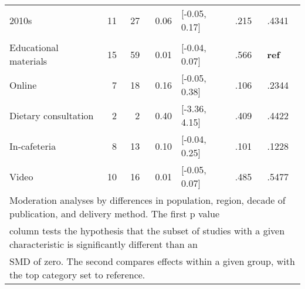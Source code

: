 \documentclass[sn-nature,referee,pdflatex]{sn-jnl}
\begin{document}
\begin{table}[!h]
\begin{tabular}[t]{lrrrlll}
\hspace{1em}2010s & 11 & 27 & 0.06 & {}[-0.05, 0.17] & .215 & .4341\\
\addlinespace[0.3em]
\multicolumn{7}{l}{\textbf{Method of Delivery}}\\
\hspace{1em}Educational materials & 15 & 59 & 0.01 & {}[-0.04, 0.07] & .566 & \textbf{ref}\\
\hspace{1em}Online & 7 & 18 & 0.16 & {}[-0.05, 0.38] & .106 & .2344\\
\hspace{1em}Dietary consultation & 2 & 2 & 0.40 & {}[-3.36, 4.15] & .409 & .4422\\
\hspace{1em}In-cafeteria & 8 & 13 & 0.10 & {}[-0.04, 0.25] & .101 & .1228\\
\hspace{1em}Video & 10 & 16 & 0.01 & {}[-0.05, 0.07] & .485 & .5477\\
\bottomrule
\multicolumn{7}{l}{\textsuperscript{} Moderation analyses by differences in population, region, decade of publication, and delivery method. The first p value}\\
\multicolumn{7}{l}{column tests the hypothesis that the subset of studies with a given characteristic is significantly different than an}\\
\multicolumn{7}{l}{SMD of zero. The second compares effects within a given group, with the top category set to reference.}\\
\end{tabular}
\end{table}
\end{document}
